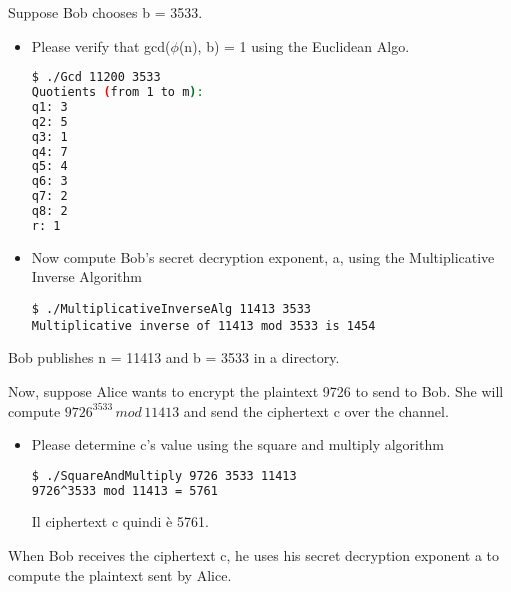 \documentclass{article}
\begin{document}
Suppose Bob chooses b = 3533.
\begin{itemize}
    \item  Please verify that gcd(\(\phi\)(n), b) = 1 using the Euclidean Algo.
    \begin{lstlisting}[language=bash]
$ ./Gcd 11200 3533
Quotients (from 1 to m):
q1: 3
q2: 5
q3: 1
q4: 7
q5: 4
q6: 3
q7: 2
q8: 2
r: 1
    \end{lstlisting}
    \item Now compute Bob’s secret decryption exponent, a, using the Multiplicative Inverse Algorithm 
        \begin{lstlisting}
$ ./MultiplicativeInverseAlg 11413 3533
Multiplicative inverse of 11413 mod 3533 is 1454
        \end{lstlisting}    

\end{itemize}

Bob publishes n = 11413 and b = 3533 in a directory.

Now, suppose Alice wants to encrypt the plaintext 9726 to send to Bob. She will compute \(9726^{3533}\,  mod  \, 11413 \) and send the ciphertext c over the channel.

\begin{itemize}
    \item Please determine c’s value using the square and multiply algorithm
    \begin{lstlisting}[language=bash]
$ ./SquareAndMultiply 9726 3533 11413
9726^3533 mod 11413 = 5761
    \end{lstlisting}
    Il ciphertext c quindi \`{e} 5761.
\end{itemize}

When Bob receives the ciphertext c, he uses his secret decryption exponent a to compute the plaintext sent by Alice.
\end{document}
